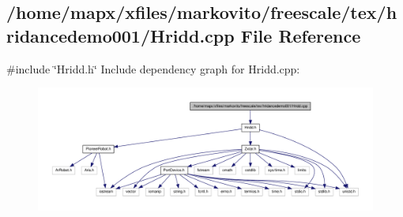 \subsection{/home/mapx/xfiles/markovito/freescale/tex/hridancedemo001/\-Hridd.cpp \-File \-Reference}
\label{_hridd_8cpp}
{\ttfamily \#include \char`\"{}\-Hridd.\-h\char`\"{}}\*
\-Include dependency graph for \-Hridd.\-cpp\-:\nopagebreak
\begin{figure}[H]
\begin{center}
\leavevmode
\includegraphics[width=350pt]{_hridd_8cpp__incl}
\end{center}
\end{figure}
